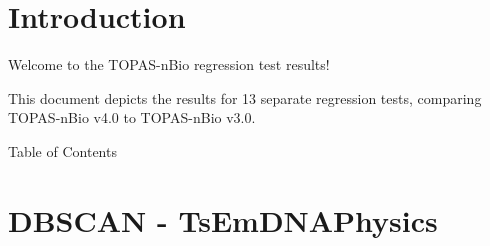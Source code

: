 \documentclass[aspectratio=1610]{beamer}
\title{\SUTname}
\subtitle{Regression testing (cf.\ \benchmarkname)}
\author{Jos\'e Ramos-M\'endez, Naoki D. Kondo, and Thongchai A.M. Masilela}
\institute{University of California San Francisco}
\date{\today}
\begin{document}
\frame{\titlepage}



\newpage

\section{Introduction}

\begin{frame}{\secname}

Welcome to the TOPAS-nBio regression test results!\vspace{5mm}

This document depicts the results for 13 separate regression tests, comparing TOPAS-nBio v4.0 to TOPAS-nBio v3.0.

\end{frame}

\begin{frame}[allowframebreaks]{Table of Contents}
\vspace{2mm}
  \tableofcontents[sections={1-12}]
    \framebreak
  \tableofcontents[sections={13-}]
\end{frame}

\section{DBSCAN - TsEmDNAPhysics}
\end{document}
